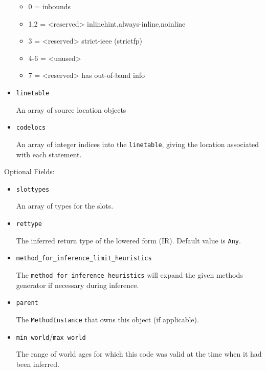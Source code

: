 \begin{itemize}
\begin{itemize}
\item 0 = inbounds


\item 1,2 = <reserved> inlinehint,always-inline,noinline


\item 3 = <reserved> strict-ieee (strictfp)


\item 4-6 = <unused>


\item 7 = <reserved> has out-of-band info

\end{itemize}

\item \texttt{linetable}

An array of source location objects


\item \texttt{codelocs}

An array of integer indices into the \texttt{linetable}, giving the location associated with each statement.

\end{itemize}


Optional Fields:



\begin{itemize}
\item \texttt{slottypes}

An array of types for the slots.


\item \texttt{rettype}

The inferred return type of the lowered form (IR). Default value is \texttt{Any}.


\item \texttt{method\_for\_inference\_limit\_heuristics}

The \texttt{method\_for\_inference\_heuristics} will expand the given method{\textquotesingle}s generator if necessary during inference.


\item \texttt{parent}

The \texttt{MethodInstance} that {\textquotedbl}owns{\textquotedbl} this object (if applicable).


\item \texttt{min\_world}/\texttt{max\_world}

The range of world ages for which this code was valid at the time when it had been inferred.

\end{itemize}


